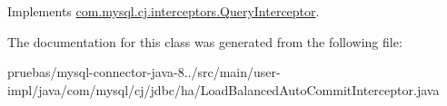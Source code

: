 Implements \mbox{\hyperlink{interfacecom_1_1mysql_1_1cj_1_1interceptors_1_1_query_interceptor_a1613f5491fdb4610d5727d60c904e7e2}{com.\+mysql.\+cj.\+interceptors.\+Query\+Interceptor}}.



The documentation for this class was generated from the following file\+:\begin{DoxyCompactItemize}
\item 
pruebas/mysql-\/connector-\/java-\/8../src/main/user-\/impl/java/com/mysql/cj/jdbc/ha/Load\+Balanced\+Auto\+Commit\+Interceptor.\+java\end{DoxyCompactItemize}
